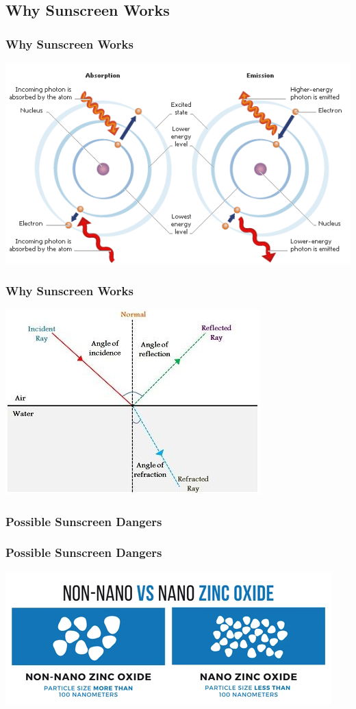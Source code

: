 \documentclass[10pt,aspectratio=169]{beamer} %
\begin{document}
\subsection{Why Sunscreen Works}
\begin{frame}\centering
  \frametitle{Why Sunscreen Works}
  \includegraphics[scale = 0.5]{Absorption.png}
\end{frame}
\begin{frame}\centering
  \frametitle{Why Sunscreen Works}
  \includegraphics[scale = 0.55]{ReflectionvsRefraction.jpg}
\end{frame}
\subsubsection{Possible Sunscreen Dangers}
\begin{frame}\centering
  \frametitle{Possible Sunscreen Dangers}
  \includegraphics[scale = 0.65]{NonNanovsNanoZO.png}
\end{frame}
\end{document}
